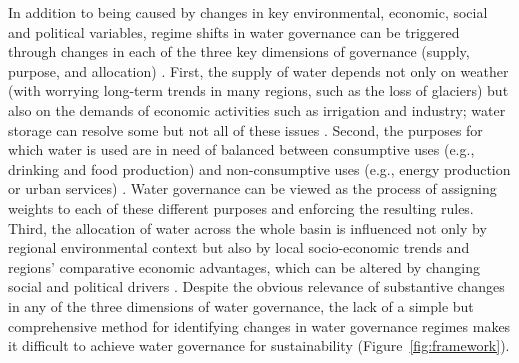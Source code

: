 \documentclass[9pt, twocolumn, twoside, lineno]{pnas-new}
\begin{document}
In addition to being caused by changes in key environmental, economic, social and political variables, regime shifts in water governance can be triggered through changes in each of the three key dimensions of governance (supply, purpose, and allocation) 
\cite{undpwatergovernancefacility2013,undpwatergovernancefacility2015,undpwatergovernancefacility2016}.
First, the supply of water depends not only on weather (with worrying long-term trends in many regions, such as the loss of glaciers) but also on the demands of economic activities such as irrigation and industry; water storage can resolve some but not all of these issues 
\cite{greveGlobalAssessmentWater2018, wada2017,qinFlexibilityintensityglobal2019}.
Second, the purposes for which water is used are in need of balanced between consumptive uses (e.g., drinking and food production) and non-consumptive uses (e.g., energy production or urban services)  
\cite{liu2017, florke2018,kleemannQuantifyinginterregionalflows2020}.
Water governance can be viewed as the process of assigning weights to each of these different purposes and enforcing the resulting rules.
Third, the allocation of water across the whole basin is influenced not only by regional environmental context but also by local socio-economic trends and regions’ comparative economic advantages, which can be altered by changing social and political drivers
\cite{roobavannan2017,speed2013}.
Despite the obvious relevance of substantive changes in any of the three dimensions of water governance, the lack of a simple but comprehensive method for identifying changes in water governance regimes makes it difficult to achieve water governance for sustainability (Figure~\ref{fig:framework}).
\end{document}
